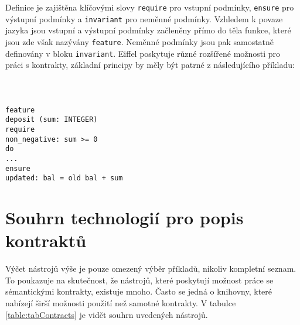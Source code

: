 			 Definice je zajištěna klíčovými slovy \texttt{require} pro vstupní podmínky, \texttt{ensure} pro výstupní podmínky a \texttt{invariant} pro neměnné podmínky. Vzhledem k povaze jazyka jsou vstupní a výstupní podmínky začleněny přímo do těla funkce, které jsou zde však nazývány \texttt{feature}. Neměnné podmínky jsou pak samostatně definovány v bloku \texttt{invariant}. Eiffel poskytuje různé rozšířené možnosti pro práci s kontrakty, základní principy by měly být patrné z následujícího příkladu:\\\\\\\\
			\- \- \- \- \- \texttt{feature}\\
			\- \- \- \- \- \- \- \- \- \- \texttt{deposit (sum: INTEGER)}\\
			\- \- \- \- \- \- \- \- \- \- \- \- \- \- \- \texttt{require}\\
			\- \- \- \- \- \- \- \- \- \- \- \- \- \- \- \- \- \- \- \- \texttt{non\_negative: sum \textgreater = 0}\\
			\- \- \- \- \- \- \- \- \- \- \- \- \- \- \- \texttt{do}\\
			\- \- \- \- \- \- \- \- \- \- \- \- \- \- \- \- \- \- \- \- \texttt{...}\\
			\- \- \- \- \- \- \- \- \- \- \- \- \- \- \- \texttt{ensure}\\
			\- \- \- \- \- \- \- \- \- \- \- \- \- \- \- \- \- \- \- \- \texttt{updated: bal = old bal + sum}

	\section{Souhrn technologií pro popis kontraktů}
		Výčet nástrojů výše je pouze omezený výběr příkladů, nikoliv kompletní seznam. To poukazuje na skutečnost, že nástrojů, které poskytují možnost práce se sémantickými kontrakty, existuje mnoho. Často se jedná o knihovny, které nabízejí širší možnosti použití než samotné kontrakty. V tabulce \ref{table:tabContracts} je vidět souhrn uvedených nástrojů. 		
		

